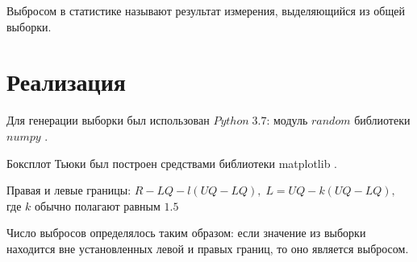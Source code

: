\documentclass[a4]{article}
\begin{document}
Выбросом в статистике называют результат измерения, выделяющийся из общей выборки.

\section{Реализация}
Для генерации выборки был использован $Python\;3.7$: модуль $random$ библиотеки $numpy$ \cite{numpy}.

Боксплот Тьюки был построен средствами библиотеки matplotlib \cite{plotlib}.

Правая и левые границы:  $R- LQ - l(UQ - LQ),\;L = UQ -k(UQ - LQ),$ где $k$ обычно полагают равным $1.5$ \cite{sas}

Число выбросов определялось таким образом: если значение из выборки находится вне установленных левой и правых границ, то оно является выбросом.




\newpage
\end{document}
